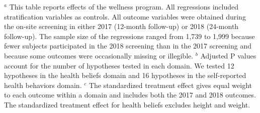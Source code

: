 \documentclass{article}
\begin{document}
\begin{table}[tbp]
{\begin{tabularx}{\linewidth}{lCClCC}
\end{tabularx}
\begin{flushleft}
\tiny $^{a}$ This table reports effects of the wellness program. All regressions included stratification variables as controls. All outcome variables were obtained during the on-site screening in either 2017 (12-month follow-up) or 2018 (24-month follow-up). The sample size of the regressions ranged from 1,739 to 1,999 because fewer subjects participated in the 2018 screening than in the 2017 screening and because some outcomes were occasionally missing or illegible. \newline $^{b}$ Adjusted P values account for the number of hypotheses tested in each domain. We tested 12 hypotheses in the health beliefs domain and 16 hypotheses in the self-reported health behaviors domain. \newline $^{c}$ The standardized treatment effect gives equal weight to each outcome within a domain and includes both the 2017 and 2018 outcomes. The standardized treatment effect for health beliefs excludes height and weight.
\end{flushleft}
}
\end{table}
\end{document}
